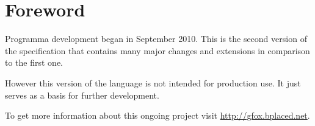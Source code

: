 \chapter{Foreword}

Programma development began in September 2010. This is the second version of the
specification that contains many major changes and extensions in comparison to the first
one.

However this version of the language is not intended for production use. It just serves as a
basis for further development.

To get more information about this ongoing project visit \url {http://gfox.bplaced.net}.